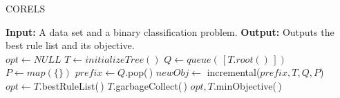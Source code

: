 \begin{algorithm}[!t]
  \caption{CORELS}
\label{alg:corels}
\begin{algorithmic}
\normalsize
\State \textbf{Input:} A data set and a binary classification problem.
\State \textbf{Output:} Outputs the best rule list and its objective.\\
\State $opt \gets NULL$
\State $T \gets initializeTree()$
\State $Q \gets queue(\,[T.root()\,])$
\State $P \gets map(\{\})$
	\State $prefix \gets Q$.pop(\,)
	\State $newObj \gets$ incremental($prefix, T, Q, P$) 
		\State $opt \gets T$.bestRuleList(\,)
		\State $T$.garbageCollect(\,)
	\EndIf
\EndWhile
\State \Return $opt, T$.minObjective(\,)
\end{algorithmic}
\end{algorithm}

